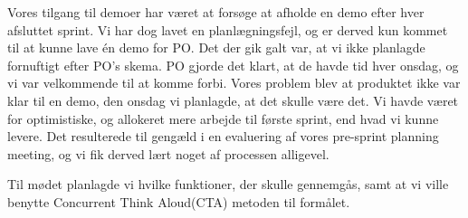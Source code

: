 Vores tilgang til demoer har været at forsøge at afholde en demo efter hver afsluttet sprint. Vi har dog lavet en planlægningsfejl, og er derved kun kommet til at kunne lave én demo for PO.
Det der gik galt var, at vi ikke planlagde fornuftigt efter PO's skema.
PO gjorde det klart, at de havde tid hver onsdag, og vi var velkommende til at komme forbi.
Vores problem blev at produktet ikke var klar til en demo, den onsdag vi planlagde, at det skulle være det.
Vi havde været for optimistiske, og allokeret mere arbejde til første sprint, end hvad vi kunne levere.
Det resulterede til gengæld i en evaluering af vores pre-sprint planning meeting, og vi fik derved lært noget af processen alligevel.
   
   Til mødet planlagde vi hvilke funktioner, der skulle gennemgås, samt at vi ville benytte Concurrent Think Aloud(CTA) metoden til formålet.\cite{cta}